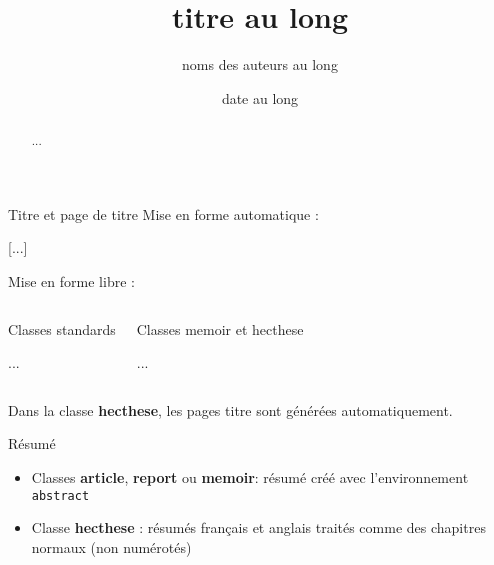 \begin{frame}[fragile]{Titre et page de titre}
	Mise en forme automatique :
\begin{codesource}
	\title[titre court]{titre au long}
	\author[nom(s) d'auteur(s) court(s)]{noms des auteurs au long}
	\date[date courte]{date au long}
	[...]
	
	\maketitle
\end{codesource}

	Mise en forme libre :
		\begin{columns}
			\begin{HECcomparaison}{Classes standards}
\begin{codesource}
	\begin{titlepage}
		...
	\end{titlepage}
\end{codesource}
			\end{HECcomparaison}
			\begin{HECcomparaison}{Classes memoir et hecthese}
\begin{codesource}
	\begin{titlingpage}
		...
	\end{titlingpage}
\end{codesource}	
			\end{HECcomparaison}
		\end{columns}
	
	Dans la classe \textbf{hecthese}, les pages titre sont générées automatiquement.
\end{frame}

\begin{frame}[fragile,c]{Résumé}
	\begin{itemize}
		\item Classes \textbf{article}, \textbf{report} ou \textbf{memoir}: résumé créé avec
		l'environnement \lstinline|abstract|
\begin{codesource}
	\begin{abstract}
		...
	\end{abstract}
\end{codesource}

		\item Classe \textbf{hecthese} : résumés français et anglais traités comme des chapitres
		normaux (non numérotés)
	\end{itemize}
\end{frame}


